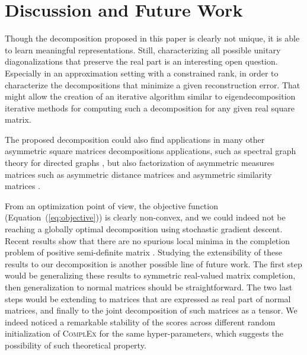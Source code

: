 \documentclass[twoside,11pt]{article}
\renewcommand{\cite}{\citep}
\begin{document}
\section{Discussion and Future Work}



Though the decomposition proposed in this paper is clearly not unique, it is able to 
learn meaningful representations.
Still, characterizing all possible unitary diagonalizations that preserve
the real part is an interesting open question. Especially in 
an approximation setting with a constrained rank, in order to characterize the
decompositions that minimize a given reconstruction error.
That
might allow the creation of an iterative 
algorithm similar to eigendecomposition iterative methods
\cite{saad1992numerical} for computing such a
decomposition for any given real square matrix.

The proposed decomposition could also find applications in many other asymmetric square matrices
decompositions applications, such as spectral graph theory for 
directed graphs \cite{cvetkovic1997eigenspaces}, but also factorization of asymmetric
measures matrices such as asymmetric distance matrices \cite{mao2004modeling} 
and asymmetric similarity matrices \cite{pirasteh2015exploiting}.


From an optimization point of view, the objective function (Equation~(\ref{eq:objective})) 
is clearly non-convex,
and we could indeed not be reaching a globally optimal decomposition using 
stochastic gradient descent. Recent results show that 
there are no spurious local minima in the completion problem
of positive semi-definite matrix
\cite{ge2016matrix,bhojanapalli2016global}. Studying the extensibility
of these results to our decomposition is another possible line of future work.
The first step would be generalizing these results to 
symmetric real-valued matrix completion, then 
generalization to normal matrices should be straightforward.
The two last steps would be extending to matrices that are expressed as real
part of normal matrices, and finally to the joint decomposition 
of such matrices as a tensor.
We indeed noticed a remarkable stability of the scores across different 
random initialization of \textsc{ComplEx} for the same hyper-parameters, which suggests the
possibility of such theoretical property.
\end{document}
